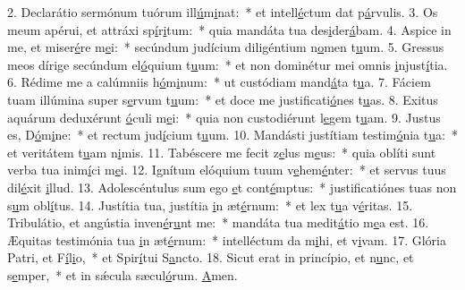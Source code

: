 2. Declarátio sermónum tuórum ill\uline{ú}m\uline{i}nat:~* et intell\uline{é}ctum dat p\uline{á}rvulis.
3. Os meum apérui, et attráxi sp\uline{í}r\uline{i}tum:~* quia mandáta tua des\uline{i}der\uline{á}bam.
4. Aspice in me, et miser\uline{é}re m\uline{e}i:~* secúndum judícium diligéntium n\uline{o}men t\uline{u}um.
5. Gressus meos dírige secúndum el\uline{ó}quium t\uline{u}um:~* et non dominétur mei omnis \uline{i}njust\uline{í}tia.
6. Rédime me a calúmniis h\uline{ó}m\uline{i}num:~* ut custódiam mand\uline{á}ta t\uline{u}a.
7. Fáciem tuam illúmina super s\uline{e}rvum t\uline{u}um:~* et doce me justificati\uline{ó}nes t\uline{u}as.
8. Exitus aquárum deduxérunt \uline{ó}culi m\uline{e}i:~* quia non custodiérunt l\uline{e}gem t\uline{u}am.
9. Justus es, D\uline{ó}m\uline{i}ne:~* et rectum jud\uline{í}cium t\uline{u}um.
10. Mandásti justítiam testim\uline{ó}nia t\uline{u}a:~* et veritátem t\uline{u}am n\uline{i}mis.
11. Tabéscere me fecit z\uline{e}lus m\uline{e}us:~* quia oblíti sunt verba tua inim\uline{í}ci m\uline{e}i.
12. Ignítum elóquium tuum v\uline{e}hem\uline{é}nter:~* et servus tuus dil\uline{é}xit \uline{i}llud.
13. Adolescéntulus sum ego \uline{e}t cont\uline{é}mptus:~* justificatiónes tuas non s\uline{u}m obl\uline{í}tus.
14. Justítia tua, justítia \uline{i}n æt\uline{é}rnum:~* et lex t\uline{u}a v\uline{é}ritas.
15. Tribulátio, et angústia inven\uline{é}r\uline{u}nt me:~* mandáta tua medit\uline{á}tio m\uline{e}a est.
16. Æquitas testimónia tua \uline{i}n æt\uline{é}rnum:~* intelléctum da m\uline{i}hi, et v\uline{i}vam.
17. Glória Patri, et F\uline{í}l\uline{i}o,~* et Spir\uline{í}tui S\uline{a}ncto.
18. Sicut erat in princípio, et n\uline{u}nc, et s\uline{e}mper,~* et in sǽcula sæcul\uline{ó}rum. \uline{A}men.
